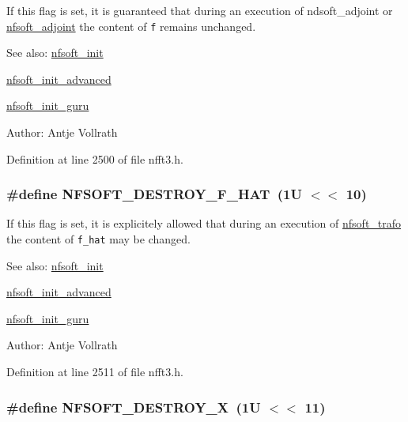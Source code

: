 If this flag is set, it is guaranteed that during an execution of ndsoft\_\-adjoint or \hyperlink{group__nfsoft_g08395b1dd90f9a2565685d17460afc5b}{nfsoft\_\-adjoint} the content of {\tt f} remains unchanged. 

\begin{Desc}
\item[See also:]\hyperlink{group__nfsoft_g31c884458165fa204073c6c16c10775e}{nfsoft\_\-init} 

\hyperlink{group__nfsoft_gf4aec4ee2a2a5d56ca27c4f1a7f90b18}{nfsoft\_\-init\_\-advanced} 

\hyperlink{group__nfsoft_g1c13cdd3f82f48fa41acdd313cdc2052}{nfsoft\_\-init\_\-guru} \end{Desc}
\begin{Desc}
\item[Author:]Antje Vollrath \end{Desc}


Definition at line 2500 of file nfft3.h.\hypertarget{group__nfsoft_gd324d67114a4f52a9fc86d2639745acd}{
\subsubsection{\setlength{\rightskip}{0pt plus 5cm}\#define NFSOFT\_\-DESTROY\_\-F\_\-HAT~(1U $<$$<$ 10)}}
\label{group__nfsoft_gd324d67114a4f52a9fc86d2639745acd}


If this flag is set, it is explicitely allowed that during an execution of \hyperlink{group__nfsoft_ge243cd75d7571a99eae53818e32355fb}{nfsoft\_\-trafo} the content of {\tt f\_\-hat} may be changed. 

\begin{Desc}
\item[See also:]\hyperlink{group__nfsoft_g31c884458165fa204073c6c16c10775e}{nfsoft\_\-init} 

\hyperlink{group__nfsoft_gf4aec4ee2a2a5d56ca27c4f1a7f90b18}{nfsoft\_\-init\_\-advanced} 

\hyperlink{group__nfsoft_g1c13cdd3f82f48fa41acdd313cdc2052}{nfsoft\_\-init\_\-guru} \end{Desc}
\begin{Desc}
\item[Author:]Antje Vollrath \end{Desc}


Definition at line 2511 of file nfft3.h.\hypertarget{group__nfsoft_gb7ca87a4bb214bcc25d544aa0b6dd503}{
\subsubsection{\setlength{\rightskip}{0pt plus 5cm}\#define NFSOFT\_\-DESTROY\_\-X~(1U $<$$<$ 11)}}
\label{group__nfsoft_gb7ca87a4bb214bcc25d544aa0b6dd503}


